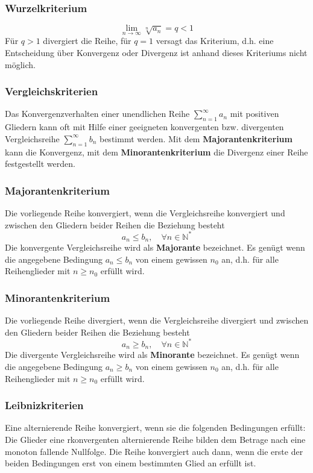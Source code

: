 \subsubsection{Wurzelkriterium}
\begin{equation}
\boxed{\displaystyle \lim_{n\rightarrow \infty}\sqrt[n]{a_n}=q<1}
\end{equation}
Für $q>1$ divergiert die Reihe, für $q=1$ versagt das Kriterium, d.h. eine Entscheidung über Konvergenz oder Divergenz ist anhand dieses Kriteriums nicht möglich.
\subsubsection{Vergleichskriterien}
Das Konvergenzverhalten einer unendlichen Reihe $\displaystyle \sum_{n=1}^{\infty}a_n$ mit positiven Gliedern kann oft mit Hilfe einer geeigneten konvergenten bzw. divergenten Vergleichsreihe $\displaystyle \sum_{n=1}^{\infty}b_n$ bestimmt werden. Mit dem \textbf{Majorantenkriterium} kann die Konvergenz, mit dem \textbf{Minorantenkriterium} die Divergenz einer Reihe festgestellt werden. 
\subsubsection{Majorantenkriterium}
Die vorliegende Reihe konvergiert, wenn die Vergleichsreihe konvergiert und zwischen den Gliedern beider Reihen die Beziehung besteht
\begin{equation}
\boxed{a_n\leq b_n,\quad \forall n\in \mathbb{N}^*}
\end{equation}
Die konvergente Vergleichsreihe wird als \textbf{Majorante} bezeichnet. Es genügt wenn die angegebene Bedingung $a_n\leq b_n$ von einem gewissen $n_0$ an, d.h. für alle Reihenglieder mit $n\geq n_0$ erfüllt wird.
\subsubsection{Minorantenkriterium}
Die vorliegende Reihe divergiert, wenn die Vergleichsreihe divergiert und zwischen den Gliedern beider Reihen die Beziehung besteht
\begin{equation}
\boxed{a_n\geq b_n,\quad \forall n\in \mathbb{N}^*}
\end{equation}
Die divergente  Vergleichsreihe wird als \textbf{Minorante} bezeichnet. Es genügt wenn die angegebene Bedingung $a_n\geq b_n$ von einem gewissen $n_0$ an, d.h. für alle Reihenglieder mit $n\geq n_0$ erfüllt wird.
\subsubsection{Leibnizkriterien}
Eine alternierende Reihe konvergiert, wenn sie die folgenden Bedingungen erfüllt: Die Glieder eine rkonvergenten alternierende Reihe bilden dem Betrage nach eine monoton fallende Nullfolge. Die Reihe konvergiert auch dann, wenn die erste der beiden Bedingungen erst von einem bestimmten Glied an erfüllt ist.
